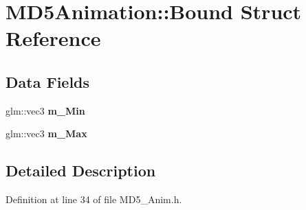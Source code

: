 \hypertarget{struct_m_d5_animation_1_1_bound}{}\section{M\+D5\+Animation\+:\+:Bound Struct Reference}
\label{struct_m_d5_animation_1_1_bound}
\subsection*{Data Fields}
\begin{DoxyCompactItemize}
\item 
glm\+::vec3 {\bfseries m\+\_\+\+Min}\hypertarget{struct_m_d5_animation_1_1_bound_ac336feaf8013f6da93cd776c0e2ebd16}{}\label{struct_m_d5_animation_1_1_bound_ac336feaf8013f6da93cd776c0e2ebd16}

\item 
glm\+::vec3 {\bfseries m\+\_\+\+Max}\hypertarget{struct_m_d5_animation_1_1_bound_a9beb9b46e65c5314646761b4a0fec54e}{}\label{struct_m_d5_animation_1_1_bound_a9beb9b46e65c5314646761b4a0fec54e}

\end{DoxyCompactItemize}


\subsection{Detailed Description}


Definition at line 34 of file M\+D5\+\_\+\+Anim.\+h.

